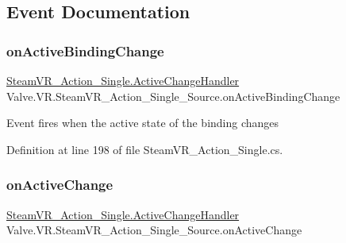 \subsection{Event Documentation}
\mbox{\label{class_valve_1_1_v_r_1_1_steam_v_r___action___single___source_a566dc4d2f667acd059038fc1a7e01c09}} 
\subsubsection{\texorpdfstring{onActiveBindingChange}{onActiveBindingChange}}
{\footnotesize\ttfamily \mbox{\hyperlink{class_valve_1_1_v_r_1_1_steam_v_r___action___single_a45ad70dbb8a58191f373b7ae098b833b}{Steam\+V\+R\+\_\+\+Action\+\_\+\+Single.\+Active\+Change\+Handler}} Valve.\+V\+R.\+Steam\+V\+R\+\_\+\+Action\+\_\+\+Single\+\_\+\+Source.\+on\+Active\+Binding\+Change}



Event fires when the active state of the binding changes 



Definition at line 198 of file Steam\+V\+R\+\_\+\+Action\+\_\+\+Single.\+cs.

\mbox{\label{class_valve_1_1_v_r_1_1_steam_v_r___action___single___source_ad6b3e0daabf6dbf1b719d1fee9fa7aee}} 
\subsubsection{\texorpdfstring{onActiveChange}{onActiveChange}}
{\footnotesize\ttfamily \mbox{\hyperlink{class_valve_1_1_v_r_1_1_steam_v_r___action___single_a45ad70dbb8a58191f373b7ae098b833b}{Steam\+V\+R\+\_\+\+Action\+\_\+\+Single.\+Active\+Change\+Handler}} Valve.\+V\+R.\+Steam\+V\+R\+\_\+\+Action\+\_\+\+Single\+\_\+\+Source.\+on\+Active\+Change}



